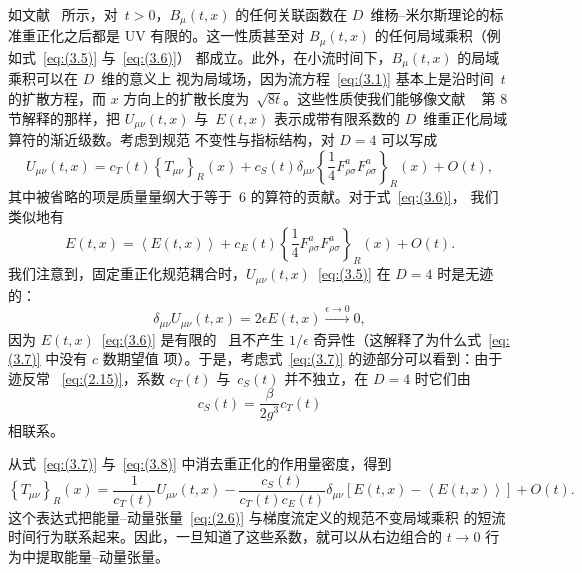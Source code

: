 如文献~\cite{Luscher:2011bx} 所示，对~$t>0$，$B_\mu(t,x)$ 的任何关联函数在
$D$~维杨--米尔斯理论的标准重正化之后都是 UV 有限的。这一性质甚至对
$B_\mu(t,x)$ 的任何局域乘积（例如式~\eqref{eq:(3.5)} 与~\eqref{eq:(3.6)}）
都成立。此外，在小流时间下，$B_\mu(t,x)$ 的局域乘积可以在 $D$~维的意义上
视为局域场，因为流方程~\eqref{eq:(3.1)} 基本上是沿时间~$t$ 的扩散方程，而
$x$ 方向上的扩散长度为~$\sqrt{8t}$。这些性质使我们能够像文献%
~\cite{Luscher:2011bx} 第 8 节解释的那样，把 $U_{\mu\nu}(t,x)$
与~$E(t,x)$ 表示成带有限系数的 $D$~维重正化局域算符的渐近级数。考虑到规范
不变性与指标结构，对 $D=4$ 可以写成
\begin{equation}
   U_{\mu\nu}(t,x)
   =c_T(t)\left\{T_{\mu\nu}\right\}_R(x)
   +c_S(t)\delta_{\mu\nu}
   \left\{\frac{1}{4}F_{\rho\sigma}^aF_{\rho\sigma}^a\right\}_R(x)
   +O(t),
\label{eq:(3.7)}
\end{equation}
其中被省略的项是质量量纲大于等于~$6$ 的算符的贡献。对于式~\eqref{eq:(3.6)}，
我们类似地有
\begin{equation}
   E(t,x)
   =\left\langle E(t,x)\right\rangle
   +c_E(t)\left\{\frac{1}{4}F_{\rho\sigma}^aF_{\rho\sigma}^a\right\}_R(x)
   +O(t).
\label{eq:(3.8)}
\end{equation}
我们注意到，固定重正化规范耦合时，$U_{\mu\nu}(t,x)$~\eqref{eq:(3.5)} 在
$D=4$ 时是无迹的：
\begin{equation}
   \delta_{\mu\nu}U_{\mu\nu}(t,x)
   =2\epsilon E(t,x)\xrightarrow{\epsilon\to0}0,
\label{eq:(3.9)}
\end{equation}
因为 $E(t,x)$~\eqref{eq:(3.6)} 是有限的~\cite{Luscher:2010iy} 且不产生
$1/\epsilon$ 奇异性（这解释了为什么式~\eqref{eq:(3.7)} 中没有 $c$ 数期望值
项）。于是，考虑式~\eqref{eq:(3.7)} 的迹部分可以看到：由于迹反常%
~\eqref{eq:(2.15)}，系数 $c_T(t)$ 与~$c_S(t)$ 并不独立，在 $D=4$
 时它们由
\begin{equation}
   c_S(t)=\frac{\beta}{2g^3}c_T(t)
\label{eq:(3.10)}
\end{equation}
相联系。

从式~\eqref{eq:(3.7)} 与~\eqref{eq:(3.8)} 中消去重正化的作用量密度，得到
\begin{equation}
   \left\{T_{\mu\nu}\right\}_R(x)
   =\frac{1}{c_T(t)}U_{\mu\nu}(t,x)
   -\frac{c_S(t)}{c_T(t)c_E(t)}\delta_{\mu\nu}
   \left[E(t,x)
   -\left\langle E(t,x)\right\rangle
   \right]
   +O(t).
\label{eq:(3.11)}
\end{equation}
这个表达式把能量--动量张量~\eqref{eq:(2.6)} 与梯度流定义的规范不变局域乘积
的短流时间行为联系起来。因此，一旦知道了这些系数，就可以从右边组合的
$t\to0$ 行为中提取能量--动量张量。
